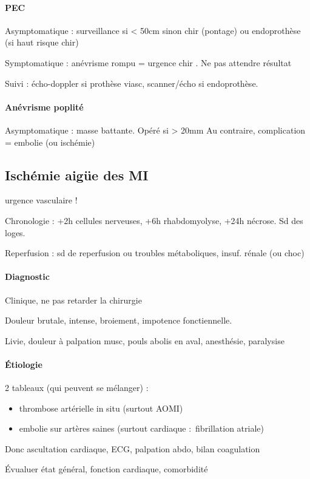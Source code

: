 \paragraph{PEC}
Asymptomatique : surveillance si \diameter < 50cm sinon chir (pontage) ou
endoprothèse (si haut risque chir)

Symptomatique : \danger anévrisme rompu = urgence chir \danger. Ne pas attendre
résultat

Suivi : écho-doppler si prothèse viasc, scanner/écho si endoprothèse.

\paragraph{Anévrisme poplité}
Asymptomatique : masse battante. Opéré si > 20mm
Au contraire, complication = embolie (ou ischémie)

\subsection{Ischémie aigüe des MI}
\danger urgence vasculaire !

Chronologie : +2h cellules nerveuses, +6h rhabdomyolyse, +24h nécrose. Sd des
loges.

Reperfusion : sd de reperfusion ou troubles métaboliques, insuf. rénale (ou
choc)

\paragraph{Diagnostic} Clinique, ne pas retarder la chirurgie \danger

Douleur brutale, intense, broiement, impotence fonctiennelle. 

Livie, douleur à palpation musc, pouls abolis en aval, anesthésie, paralysise

\paragraph{Étiologie} 2 tableaux (qui peuvent se mélanger) :
\begin{itemize}
  \item thrombose artérielle in situ (surtout AOMI)
  \item embolie sur artères saines (surtout cardiaque : fibrillation atriale)
\end{itemize}
Donc ascultation cardiaque, ECG, palpation abdo, bilan coagulation

Évualuer état général, fonction cardiaque, comorbidité

